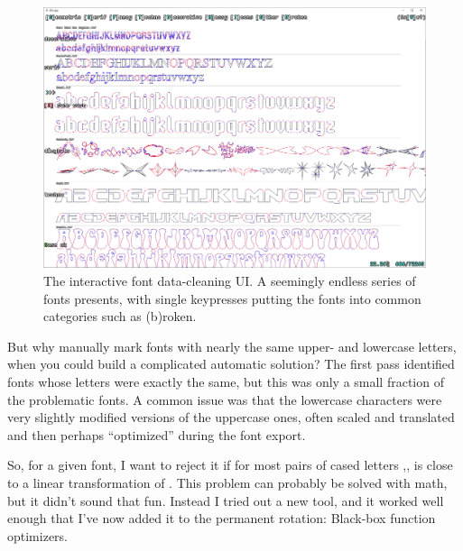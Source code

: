 \documentclass[twocolumn]{article}
\begin{document}
\begin{figure}[tp]
\centering
  \includegraphics[width=0.98 \linewidth]{sortition}
\caption{ The interactive font data-cleaning UI. A seemingly endless
  series of fonts presents, with single keypresses putting the fonts
  into common categories such as (b)roken.
} \label{fig:sortition}
\end{figure}

But why manually mark fonts with nearly the same upper- and
lowercase letters, when you could build a complicated automatic
solution? The first pass identified fonts whose letters were
exactly the same, but this was only a small fraction of the
problematic fonts. A common issue was that the lowercase characters
were very slightly modified versions of the uppercase ones, often
scaled and translated and then perhaps ``optimized'' during the
font export.

So, for a given font, I want to reject it if for most pairs of cased
letters ,,  is close to a
linear transformation of . This problem can probably be
solved with math, but it didn't sound that fun. Instead I tried out
a new tool, and it worked well enough that I've now added it to the
permanent rotation: Black-box function optimizers.
\end{document}
